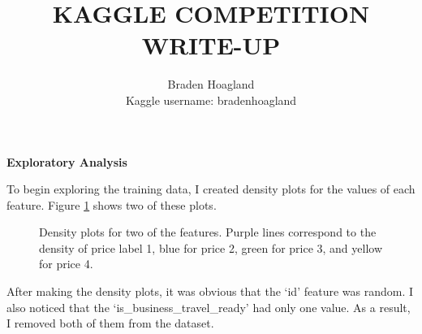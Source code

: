 \documentclass{ws-ijprai}
\newcommand{\subheader}[1]{\bigskip\begin{center}\textbf{#1}\end{center}}
\begin{document}

\title{\uppercase{Kaggle Competition Write-Up}}
\author{Braden Hoagland \\ Kaggle username: bradenhoagland}
\address{COMPSCI 671: Machine Learning}

\maketitle
\thispagestyle{empty}

\subheader{Exploratory Analysis}

To begin exploring the training data, I created density plots for the values of each feature. Figure \ref{fig:densities} shows two of these plots.

\begin{figure}[H]
  \centering
  \caption{Density plots for two of the features. Purple lines correspond to the density of price label 1, blue for price 2, green for price 3, and yellow for price 4.}
  \label{fig:densities}
\end{figure}

After making the density plots, it was obvious that the `id' feature was random. I also noticed that the `is\_business\_travel\_ready' had only one value. As a result, I removed both of them from the dataset.
\end{document}
